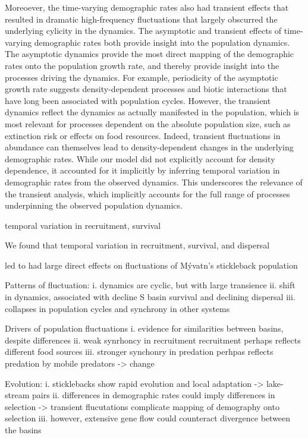 \documentclass[11pt]{article}
\begin{document}
Moreoever, the time-varying demographic rates also had transient effects that resulted 
in dramatic high-frequency fluctuations that largely obscurred the underlying cylicity
in the dynamics. 
The asymptotic and transient effects of time-varying demographic rates both provide
insight into the population dynamics.
The asymptotic dynamics provide the most direct mapping of the demographic rates onto the 
population growth rate, and thereby provide insight into the processes driving the dynamics.
For example, periodicity of the asymptotic growth rate suggests density-dependent processes
and biotic interactions that have long been associated with population cycles.
However, the transient dynamics reflect the dynamics as actually manifested in the population,
which is most relevant for processes dependent on the absolute population size, 
such as extinction risk or effects on food resources.
Indeed, transient fluctuations in abundance can themselves lead to density-dependent changes 
in the underlying demographic rates.
While our model did not explicitly account for density dependence,
it accounted for it implicitly by inferring temporal variation in demographic rates 
from the observed dynamics.
This underscores the relevance of the transient analysis, 
which implicitly accounts for the full range of processes 
underpinning the observed population dynamics.






temporal variation in recruitment, survival

We found that temporal variation in recruitment, survival, and dispersal 


led to 
had large direct effects on fluctuations of M\'{y}vatn's stickleback population

Patterns of fluctuation:
  i. dynamics are cyclic, but with large transience
  ii. shift in dynamics, associated with decline S basin survival and declining dispersal
  iii. collapses in population cycles and synchrony in other systems
  
Drivers of population fluctuations
  i. evidence for similarities between basins, despite differences
  ii. weak synrhoncy in recruitment recruitment perhaps reflects different food sources
  iii. stronger synchonry in predation perhpas reflects predation by mobile predators
   -> change 

Evolution:
i. sticklebacks show rapid evolution and local adaptation
  -> lake-stream pairs
ii. differences in demographic rates could imply differences in selection
  -> transient flucutations complicate mapping of demography onto selection
iii. however, extensive gene flow could counteract divergence between the basins
\end{document}
